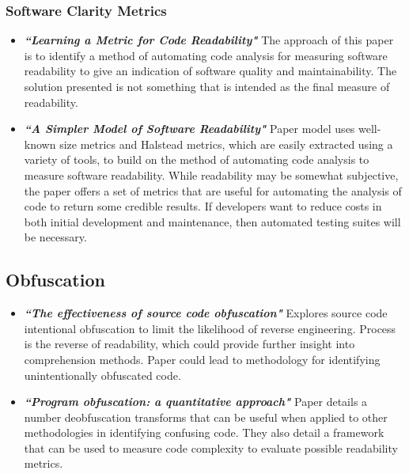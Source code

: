 \documentclass[a4paper, 10pt]{IEEEtran}
\begin{document}
\subsubsection{Software Clarity Metrics}
\begin{itemize}
    \item \textbf{\textit{“Learning a Metric for Code Readability"}}
    The approach of this paper is to identify a method of automating code analysis for measuring software readability to give an indication of software quality and maintainability. The solution presented is not something that is intended as the final measure of readability.
    \item \textbf{\textit{“A Simpler Model of Software Readability"}}
    Paper model uses well-known size metrics and Halstead metrics, which are easily extracted using
    a variety of tools, to build on the method of automating code analysis to measure software readability. While readability may be somewhat subjective, the paper offers a set of metrics that are useful for automating the analysis of code to return some credible results. If developers want to reduce costs in both initial development and maintenance, then automated testing suites will be necessary. 
\end{itemize}

\subsection{Obfuscation}
\begin{itemize}
    \item \textbf{\textit{“The effectiveness of source code obfuscation"}}
    Explores source code intentional obfuscation to limit the likelihood of reverse engineering. Process is the reverse of readability, which could provide further insight into comprehension methods. Paper could lead to methodology for identifying unintentionally obfuscated code.
    \item \textbf{\textit{“Program obfuscation: a quantitative approach"}}
    Paper details a number deobfuscation transforms that can be useful when applied to other methodologies in identifying confusing code. They also detail a framework that can be used to measure code complexity to evaluate possible readability metrics.
    
\end{itemize}
\end{document}

